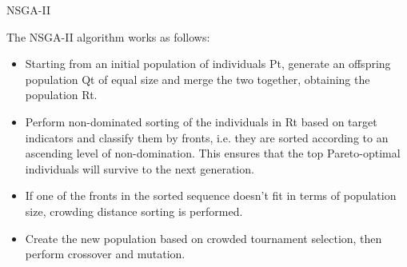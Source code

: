 \begin{algorithm}[H]
    \caption{NSGA-II}


    \DontPrintSemicolon 
    
\end{algorithm}

The NSGA-II algorithm works as follows:
\begin{itemize}
    \item Starting from an initial population of individuals Pt, generate an offspring population Qt of equal size and merge the two together, obtaining the population Rt.
    \item Perform non-dominated sorting of the individuals in Rt based on target indicators and classify them by fronts, i.e. they are sorted according to an ascending level of non-domination.  This ensures that the top Pareto-optimal individuals will survive to the next generation.
    \item If one of the fronts in the sorted sequence doesn't fit in terms of population size, crowding distance sorting is performed.
    \item Create the new population based on crowded tournament selection, then perform crossover and mutation. 
\end{itemize}


